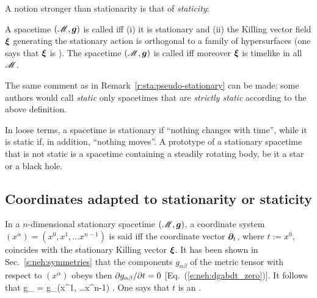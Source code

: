 A notion stronger than stationarity is that of \emph{staticity}:

\begin{greybox}
A spacetime $(\mathscr{M},\bm{g})$ is called 
iff (i) it is stationary and (ii) the Killing vector field $\bm{\xi}$
generating the stationary action is orthogonal to a family of hypersurfaces
(one says that $\bm{\xi}$ is ).
The spacetime $(\mathscr{M},\bm{g})$ is called 
iff moreover $\bm{\xi}$ is timelike in all $\mathscr{M}$.
\end{greybox}

\begin{remark}
The same comment as in Remark~\ref{r:sta:pseudo-stationary} can be made: some authors
would call \emph{static} only spacetimes that are
\emph{strictly static} according to the above definition.
\end{remark}

In loose terms, a spacetime is stationary if ``nothing changes with time'', while
it is static if, in addition, ``nothing moves''. A prototype of a stationary
spacetime that is not static is a spacetime containing a steadily rotating
body, be it a star or a black hole.


\subsection{Coordinates adapted to stationarity or staticity}

In a $n$-dimensional stationary spacetime $(\mathscr{M},\bm{g})$, a coordinate system $(x^\alpha) = (x^0, x^1, \ldots  x^{n-1})$
is said  iff the coordinate vector
$\bm{\partial}_t$, where $t := x^0$, coincides with the stationary Killing vector $\bm{\xi}$.
It has been shown in Sec.~\ref{s:neh:symmetries} that the components $g_{\alpha\beta}$
of the metric tensor with respect to $(x^\alpha)$ obeys then ${\partial g_{\alpha\beta}}/{\partial t} = 0$
[Eq.~(\ref{e:neh:dgabdt_zero})]. It follows that
\be
   g_{\alpha\beta}  = g_{\alpha\beta}(x^1, \ldots  x^{n-1}) .
\ee
One says that $t$ is an .

